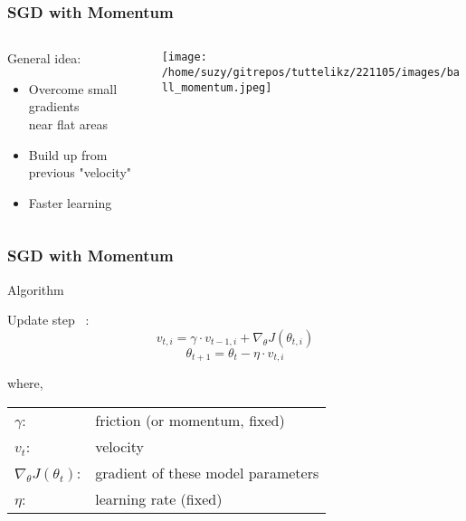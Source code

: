    \begin{frame}
      \frametitle{SGD with Momentum} %
      
      \begin{columns}
          \begin{column}{0.5\textwidth}
            General idea:
            \begin{itemize}
              \item Overcome small gradients \\ near flat areas
              \item Build up from previous "velocity"
              \item Faster learning
            \end{itemize}
          \end{column}
          \begin{column}{0.5\textwidth}  %
              \begin{center}
                \texttt{[image: /home/suzy/gitrepos/tuttelikz/221105/images/ball\_momentum.jpeg]}
              \end{center}
          \end{column}
      \end{columns}
    \end{frame}

    \begin{frame}
      \frametitle{SGD with Momentum}
      \begin{block}{Algorithm}

        Update step ~\cite{qian1999momentum}:
        \begin{equation}    %
          v_{t,i} = \gamma \cdot v_{t-1,i} + \nabla_{\theta}J(\theta_{t,i})
        \end{equation}
        \begin{equation}    %
          \theta_{t+1} = \theta_{t} - \eta \cdot v_{t,i}
        \end{equation}

        \vskip 0.3cm
        where, \\
        \begin{tabular}{l l}
          $\gamma$: & friction (or momentum, fixed) \\
          $v_{t}$: & velocity \\
          $\nabla_{\theta}J(\theta_t)$: & gradient of these model parameters \\
          $\eta$: & learning rate (fixed)
        \end{tabular}
      \end{block}
    \end{frame}



